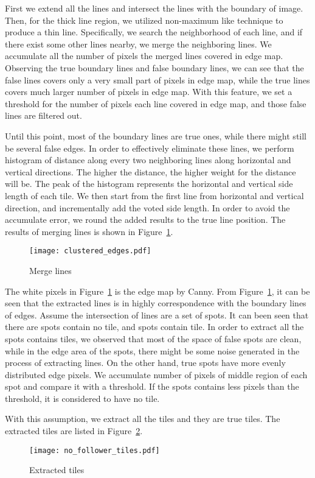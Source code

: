 \begin{enumerate}
			First we extend all the lines and intersect the lines with the boundary of image. Then, for 
			the thick line region, we utilized non-maximum like technique to produce a thin line. Specifically, 
			we search the neighborhood of each line, and if there exist some other lines nearby, we merge the 
			neighboring lines. We accumulate all the number of pixels the merged lines covered in edge map. 
			Observing the true boundary lines and false boundary lines, we can see that the false lines covers 
			only a very small part of pixels in edge map, while the true lines covers much larger number of pixels 
			in edge map. With this feature, we set a threshold for the number of pixels each line covered in edge 
			map, and those false lines are filtered out. 
			
			Until this point, most of the boundary lines are true ones, while there might still be several false 
			edges. In order to effectively eliminate these lines, we perform histogram of distance along every two 
			neighboring lines along horizontal and vertical directions. The higher the distance, the higher weight 
			for the distance will be. The peak of the histogram represents the horizontal and vertical side length 
			of each tile. We then start from the first line from horizontal and vertical direction, and 
			incrementally add the voted side length. In order to avoid the accumulate error, we round the added 
			results to the true line position. The results of merging lines is shown in Figure~\ref{Merge_line}. 
			
			\begin{figure}[htbp]
				  \centering
				  \texttt{[image: clustered\_edges.pdf]}
				  \caption{Merge lines}
				  \label{Merge_line}
			\end{figure}
\end{enumerate}
	The white pixels in Figure~\ref{Merge_line} is the edge map by Canny. From Figure~\ref{Merge_line}, it can be 
	seen that the extracted lines is in highly correspondence with the boundary 
	lines of edges. Assume the intersection of lines are a set of spots. It can been seen that there are spots contain
	no tile, and spots contain tile. In order to extract all the spots contains tiles, we observed that most of the 
	space of false spots are clean, while in the edge area of the spots, there might be some noise generated in the 
	process of extracting lines. On the other hand, true spots have more evenly distributed edge pixels. We accumulate 
	number of pixels of middle region of each spot and compare it with a threshold. If the spots contains less pixels 
	than the threshold, it is considered to have no tile.
	
	With this assumption, we extract all the tiles and they are true tiles. The extracted tiles are listed in 
	Figure~\ref{ex_tiles}.
	
	\begin{figure}[htbp]
		  \centering
		  \texttt{[image: no\_follower\_tiles.pdf]}
		  \caption{Extracted tiles}
		  \label{ex_tiles}
	\end{figure}
	
	